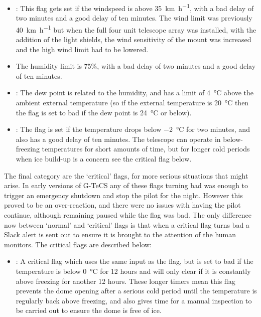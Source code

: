 \begin{colsection}
\begin{itemize}
    \item {}: This flag gets set if the windspeed is above \SI{35}{\kilo\meter\per\hour}, with a bad delay of two minutes and a good delay of ten minutes. The wind limit was previously \SI{40}{\kilo\metre\per\hour} but when the full four unit telescope array was installed, with the addition of the light shields, the wind sensitivity of the mount was increased and the high wind limit had to be lowered.

    \item {} The humidity limit is 75\%, with a bad delay of two minutes and a good delay of ten minutes.

    \item {}: The dew point is related to the humidity, and has a limit of \SI{4}{\celsius} above the ambient external temperature (so if the external temperature is \SI{20}{\celsius} then the flag is set to bad if the dew point is \SI{24}{\celsius} or below).

    \item {}: The  flag is set if the temperature drops below \SI{-2}{\celsius} for two minutes, and also has a good delay of ten minutes. The telescope can operate in below-freezing temperatures for short amounts of time, but for longer cold periods when ice build-up is a concern see the critical  flag below.

\end{itemize}

The final category are the `critical' flags, for more serious situations that might arise. In early versions of G-TeCS any of these flags turning bad was enough to trigger an emergency shutdown and stop the pilot for the night. However this proved to be an over-reaction, and there were no issues with having the pilot continue, although remaining paused while the flag was bad. The only difference now between `normal' and `critical' flags is that when a critical flag turns bad a Slack alert is sent out to ensure it is brought to the attention of the human monitors. The critical flags are described below:

\begin{itemize}
    \item {}: A critical flag which uses the same input as the  flag, but is set to bad if the temperature is below \SI{0}{\celsius} for 12 hours and will only clear if it is constantly above freezing for another 12 hours. These longer timers mean this flag prevents the dome opening after a serious cold period until the temperature is regularly back above freezing, and also gives time for a manual inspection to be carried out to ensure the dome is free of ice.


\end{itemize}
\end{colsection}
